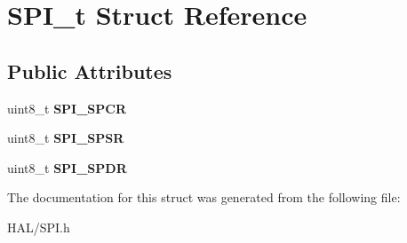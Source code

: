 \hypertarget{struct_s_p_i__t}{}\section{S\+P\+I\+\_\+t Struct Reference}
\label{struct_s_p_i__t}
\subsection*{Public Attributes}
\begin{DoxyCompactItemize}
\item 
\mbox{\label{struct_s_p_i__t_af6b46e9020f94f5fe61111531af68d65}} 
uint8\+\_\+t {\bfseries S\+P\+I\+\_\+\+S\+P\+CR}
\item 
\mbox{\label{struct_s_p_i__t_aee564f523d74bf3a84b5f6fe9e91e702}} 
uint8\+\_\+t {\bfseries S\+P\+I\+\_\+\+S\+P\+SR}
\item 
\mbox{\label{struct_s_p_i__t_afcaa85698b453ff0ec76bf92bd175cb3}} 
uint8\+\_\+t {\bfseries S\+P\+I\+\_\+\+S\+P\+DR}
\end{DoxyCompactItemize}


The documentation for this struct was generated from the following file\+:\begin{DoxyCompactItemize}
\item 
H\+A\+L/S\+P\+I.\+h\end{DoxyCompactItemize}
